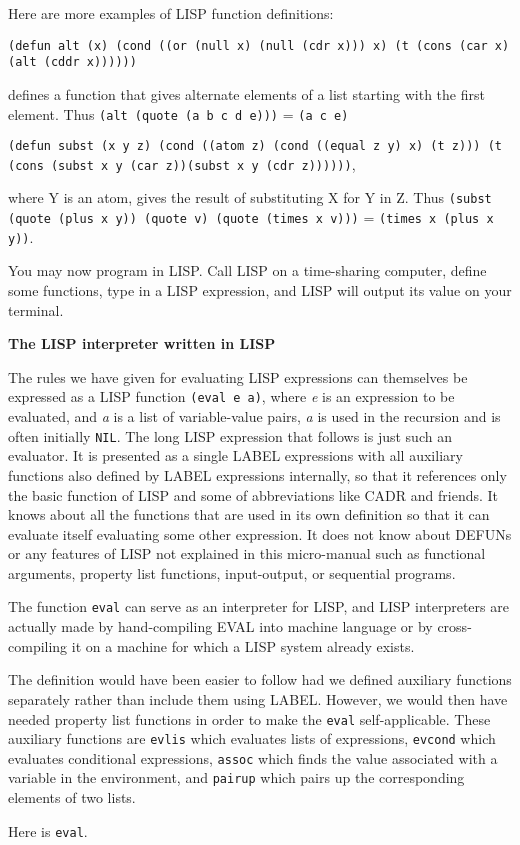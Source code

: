\documentclass[8pt,letter,twocolumn]{article}
\begin{document}
Here are more examples of LISP function definitions:

\texttt{(defun alt (x) (cond ((or (null x) (null (cdr x))) x) (t (cons (car x)
  (alt (cddr x))))))}

defines a function that gives alternate elements of a list starting with the
first element. Thus \texttt{(alt (quote (a b c d e)))} = \texttt{(a c e)}

\texttt{(defun subst (x y z) (cond ((atom z) (cond ((equal z y) x) (t z))) (t
  (cons (subst x y (car z))(subst x y (cdr z))))))},

where Y is an atom, gives the result of substituting X for Y in Z. Thus
\texttt{(subst (quote (plus x y)) (quote v) (quote (times x v)))} =
\texttt{(times x (plus x y))}.

You may now program in LISP. Call LISP on a time-sharing computer, define some
functions, type in a LISP expression, and LISP will output its value on your
terminal.

\vspace*{1\baselineskip}
\textbf{The LISP interpreter written in LISP}
\vspace*{1\baselineskip}

The rules we have given for evaluating LISP expressions can themselves be
expressed as a LISP function \texttt{(eval e a)}, where \textit{e} is an
expression to be evaluated, and \textit{a} is a list of variable-value pairs,
\textit{a} is used in the recursion and is often initially \texttt{NIL}. The
long LISP expression that follows is just such an evaluator. It is presented as
a single LABEL expressions with all auxiliary functions also defined by LABEL
expressions internally, so that it references only the basic function of LISP
and some of abbreviations like CADR and friends. It knows about all the
functions that are used in its own definition so that it can evaluate itself
evaluating some other expression. It does not know about DEFUNs or any features
of LISP not explained in this micro-manual such as functional arguments,
property list functions, input-output, or sequential programs.

The function \texttt{eval} can serve as an interpreter for LISP, and LISP
interpreters are actually made by hand-compiling EVAL into machine language or
by cross-compiling it on a machine for which a LISP system already exists.

The definition would have been easier to follow had we defined auxiliary
functions separately rather than include them using LABEL. However, we would
then have needed property list functions in order to make the \texttt{eval}
self-applicable. These auxiliary functions are \texttt{evlis} which evaluates
lists of expressions, \texttt{evcond} which evaluates conditional expressions,
\texttt{assoc} which finds the value associated with a variable in the
environment, and \texttt{pairup} which pairs up the corresponding elements of
two lists.

\newpage
Here is \texttt{eval}.

\end{document}

